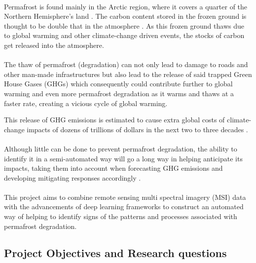 \documentclass{article}
\begin{document}
\paragraph{}
Permafrost is found mainly in the Arctic region, where it covers a quarter of the Northern Hemisphere's land \cite{OLTHOF2015194}. The carbon content stored in the frozen ground is thought to be double that in the atmosphere \cite{climatechange12}. As this frozen ground thaws due to global warming and other climate-change driven events, the stocks of carbon get released into the atmosphere.

\paragraph{}
The thaw of permafrost (degradation) can not only lead to damage to roads and other man-made infrastructures but also lead to the release of said trapped Green House Gases (GHGs) which consequently could contribute further to global warming and even more permafrost degradation \cite{MURTON2021857} as it warms and thaws at a faster rate, creating a vicious cycle of global warming.

This release of GHG emissions is estimated to cause extra global costs of climate-change impacts of dozens of trillions of dollars in the next two to three decades \cite{climatechange34}. 

\paragraph{}
Although little can be done to prevent permafrost degradation, the ability to identify it in a semi-automated way will go a long way in helping anticipate its impacts, taking them into account when forecasting GHG emissions and developing mitigating responses accordingly \cite{monitoringperma}.

\paragraph{}
This project aims to combine remote sensing multi spectral imagery (MSI) data with the advancements of deep learning frameworks to construct an automated way of helping to identify signs of the patterns and processes associated with permafrost degradation.


\subsection{Project Objectives and Research questions}
\end{document}
